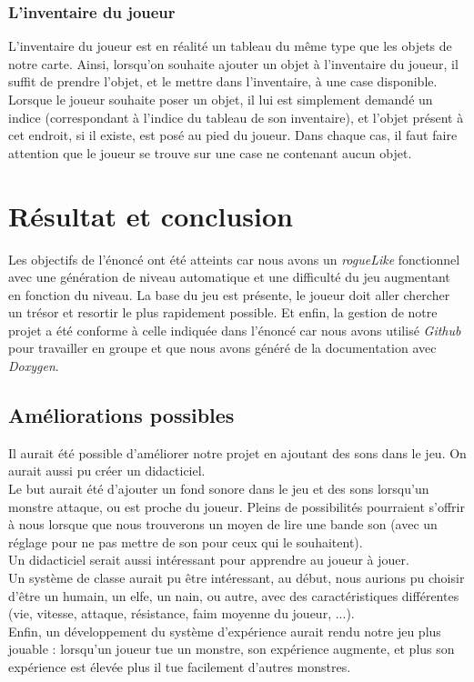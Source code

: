\documentclass[11pt]{report}
\begin{document}
		\subsection{L'inventaire du joueur}

		L'inventaire du joueur est en réalité un tableau du même type que les objets de notre carte. Ainsi, lorsqu'on souhaite ajouter un objet à l'inventaire du joueur, il suffit de prendre l'objet, et le mettre dans l'inventaire, à une case disponible. Lorsque le joueur souhaite poser un objet, il lui est simplement demandé un indice (correspondant à l'indice du tableau de son inventaire), et l'objet présent à cet endroit, si il existe, est posé au pied du joueur. Dans chaque cas, il faut faire attention que le joueur se trouve sur une case ne contenant aucun objet.

\chapter{Résultat et conclusion}

	Les objectifs de l'énoncé ont été atteints car nous avons un \emph{rogueLike} fonctionnel avec une génération de niveau automatique et une difficulté du jeu augmentant en fonction du niveau. La base du jeu est présente, le joueur doit aller chercher un trésor et resortir le plus rapidement possible. Et enfin, la gestion de notre projet a été conforme à celle indiquée dans l'énoncé car nous avons utilisé \emph{Github} pour travailler en groupe et que nous avons généré de la documentation avec \emph{Doxygen}.
	
	\section{Améliorations possibles}
	
	Il aurait été possible d'améliorer notre projet en ajoutant des sons dans le jeu. On aurait aussi pu créer un didacticiel. \\
	Le but aurait été d'ajouter un fond sonore dans le jeu et des sons lorsqu'un monstre attaque, ou est proche du joueur. Pleins de possibilités pourraient s'offrir à nous lorsque que nous trouverons un moyen de lire une bande son (avec un réglage pour ne pas mettre de son pour ceux qui le souhaitent). \\
	Un didacticiel serait aussi intéressant pour apprendre au joueur à jouer.\\
	Un système de classe aurait pu être intéressant, au début, nous aurions pu choisir d'être un humain, un elfe, un nain, ou autre, avec des caractéristiques différentes (vie, vitesse, attaque, résistance, faim moyenne du joueur, ...).\\
	Enfin, un développement du système d'expérience aurait rendu notre jeu plus jouable : lorsqu'un joueur tue un monstre, son expérience augmente, et plus son expérience est élevée plus il tue facilement d'autres monstres.
	
\end{document}
